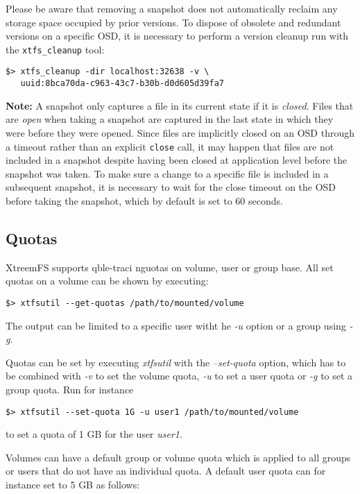 \documentclass[a4paper,10pt]{book}
\begin{document}
Please be aware that removing a snapshot does not automatically reclaim any storage space occupied by prior versions. To dispose of obsolete and redundant versions on a specific OSD, it is necessary to perform a version cleanup run with the \texttt{xtfs\_cleanup} tool:

\begin{verbatim}
$> xtfs_cleanup -dir localhost:32638 -v \
   uuid:8bca70da-c963-43c7-b30b-d0d605d39fa7
\end{verbatim}

\textbf{Note:} A snapshot only captures a file in its current state if it is \emph{closed}. Files that are \emph{open} when taking a snapshot are captured in the last state in which they were before they were opened. Since files are implicitly closed on an OSD through a timeout rather than an explicit \texttt{close} call, it may happen that files are not included in a snapshot despite having been closed at application level before the snapshot was taken. To make sure a change to a specific file is included in a subsequent snapshot, it is necessary to wait for the close timeout on the OSD before taking the snapshot, which by default is set to 60 seconds.

\subsection{Quotas}

XtreemFS supports qble-traci  nguotas on volume, user or group base. All set quotas on a
volume can be shown by executing:

\begin{verbatim}
$> xtfsutil --get-quotas /path/to/mounted/volume
\end{verbatim}

The output can be limited to a specific user witht he \emph{-u} option or a
group using \emph{-g}.

Quotas can be set by executing \emph{xtfsutil} with the \emph{--set-quota}
option, which has to be combined with \emph{-v} to set the volume quota,
\emph{-u} to set a user quota or \emph{-g} to set a group quota. Run for
instance

\begin{verbatim}
$> xtfsutil --set-quota 1G -u user1 /path/to/mounted/volume
\end{verbatim}

to set a quota of 1 GB for the user \emph{user1}.

Volumes can have a default group or volume quota which is applied to all groups
or users that do not have an individual quota. A default user quota can for
instance set to 5 GB as follows:
\end{document}
